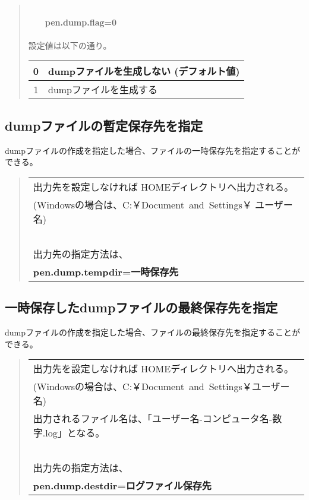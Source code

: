 \documentclass[10pt,a4j]{jarticle}
\begin{document}
\begin{quotation}
\noindent [使用例]\\
~~~~{\bf{pen.dump.flag=0}}\\
\ \\
設定値は以下の通り。\\

\begin{tabular}{c|l}
\hline
0 & dumpファイルを生成しない (デフォルト値) \\
\hline
1 & dumpファイルを生成する \\
\hline
\end{tabular}


\end{quotation}

\subsection{dumpファイルの暫定保存先を指定}
dumpファイルの作成を指定した場合、ファイルの一時保存先を指定することができる。
\begin{quotation}
\begin{tabular}{l}
出力先を設定しなければ HOMEディレクトリへ出力される。\\
(Windowsの場合は、C:￥Document~and~Settings￥ ユーザー名) \\
\ \\
出力先の指定方法は、\\
{\bf{pen.dump.tempdir=一時保存先}} \\
\end{tabular}
\end{quotation}

\subsection{一時保存したdumpファイルの最終保存先を指定}
dumpファイルの作成を指定した場合、ファイルの最終保存先を指定することができる。
\begin{quotation}

\begin{tabular}{l}
出力先を設定しなければ HOMEディレクトリへ出力される。\\
(Windowsの場合は、C:￥Document\ and\ Settings￥ユーザー名) \\
出力されるファイル名は、「ユーザー名-コンピュータ名-数字.log」となる。\\
\ \\
出力先の指定方法は、\\
{\bf{pen.dump.destdir=ログファイル保存先}} \\
\end{tabular}

\end{quotation}
\end{document}
